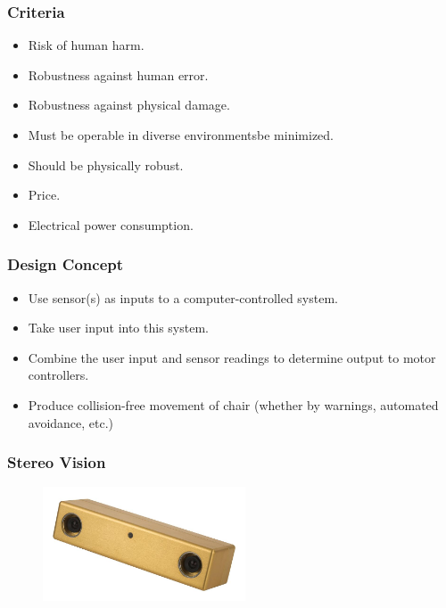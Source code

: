 \documentclass{beamer}
\begin{document}
\begin{frame}
  \frametitle{Criteria}
  \begin{itemize}
    \item Risk of human harm.\\
    \item Robustness against human error.\\
    \item Robustness against physical damage.\\
    \item Must be operable in diverse environmentsbe minimized. \\
    \item Should be physically robust. \\
    \item Price.\\
    \item Electrical power consumption.\\
  \end{itemize}
\end{frame}

\begin{frame}
  \frametitle{Design Concept}
  \begin{itemize}
    \item Use sensor(s) as inputs to a computer-controlled system. \\
    \item Take user input into this system. \\
    \item Combine the user input and sensor readings to determine output to motor controllers. \\
    \item Produce collision-free movement of chair (whether by warnings, automated avoidance, etc.) \\
  \end{itemize}
\end{frame}

\begin{frame}
  \frametitle{Stereo Vision}
  \begin{figure}
    \centering
    \includegraphics[width=6cm]{stereovision.jpg}
  \end{figure}
\end{frame}
\end{document}
